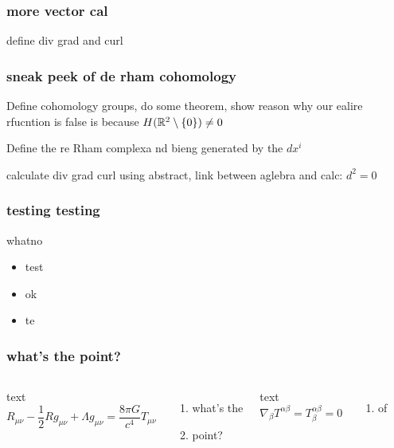 \documentclass[xcolor=dvipsnames]{beamer}
\begin{document}
    \begin{frame}
        \frametitle{more vector cal} 
        define div grad and curl
    \end{frame}

    \begin{frame}
        \frametitle{sneak peek of de rham cohomology} 
        Define cohomology groups, do some theorem, show reason why our ealire rfucntion is false is because $H(\mathbb{R}^2\setminus \{0\} )\neq 0$
    \end{frame}

    \begin{frame}
       Define the re Rham complexa nd bieng generated by the $dx^i $ 
    \end{frame}

    \begin{frame}
        calculate div grad curl using abstract, link between aglebra and calc: $d^2=0$
    \end{frame}
    \begin{frame}
        \frametitle{testing testing} 
        \begin{definition}
            what\alert{no} 
        \end{definition}
        \begin{itemize}
            \item<1->test 
            \item<2-> ok
            \item<3->te
            \end{itemize} 
    \end{frame}

    \begin{frame}
        \frametitle{what's the point?} 
        \begin{columns}
            text
            \[
            R_{\mu \nu}-\frac{1}{2}R g_{\mu\nu}+\Lambda g_{\mu\nu}=\frac{8 \pi G}{c^4}T_{\mu\nu}
            \] 
            \begin{enumerate}
                \item what's the
                \item point?
            \end{enumerate}
            text
            \[
            \nabla _{\beta }T^{\alpha \beta }=T^{\alpha \beta }_{\beta }=0
            \] 
            \begin{enumerate}
                \item of
            \end{enumerate}
        \end{columns}
    \end{frame}
\end{document}
